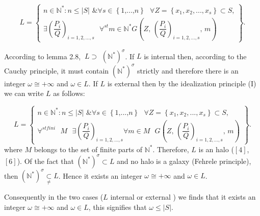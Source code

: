 \documentclass[12pt]{article}
\begin{document}
\begin{equation*}
L=\left\{ 
\begin{array}{c}
n\in \mathbb{N}^{\ast }:n\leq \left\vert S\right\vert \text{ \&}\forall s\in
\left\{ 1\text{,}...\text{,}n\right\} \text{ }\forall Z=\left\{
x_{1},x_{2},...,x_{s}\right\} \subset S\text{,} \\ 
\exists \left( \dfrac{P_{i}}{Q}\right) _{i=1,2,...,s}\text{ }\forall
^{st}m\in \mathbb{N}^{\ast }G\left( Z\text{, }\left( \dfrac{P_{i}}{Q}\right)
_{i=1,2,...,s}\text{, }m\right)%
\end{array}%
\right\} \text{.}
\end{equation*}

According to lemma 2.8, $\ L\supset $ $\left( \mathbb{N}^{\ast }\right)
^{\sigma }$. If $L$ is internal then, according to the Cauchy principle, it
must contain $\left( \mathbb{N}^{\ast }\right) ^{\sigma }$ strictly and
therefore there is an integer $\omega \cong +\infty $ and $\omega \in L$. If 
$L$ is external then by the idealization principle (I) we can write $L$ as
follows:\newline

\begin{equation*}
L=\left\{ 
\begin{array}{c}
n\in \mathbb{N}^{\ast }:n\leq \left\vert S\right\vert \text{ \&}\forall s\in
\left\{ 1\text{,}...\text{,}n\right\} \text{ }\forall Z=\left\{
x_{1},x_{2},...,x_{s}\right\} \subset S\text{,} \\ 
\forall ^{stfini}\text{ }M\text{ }\exists \left( \dfrac{P_{i}}{Q}\right)
_{i=1,2,...,s}\forall m\in M\text{ }G\left( Z\text{, }\left( \dfrac{P_{i}}{Q}%
\right) _{i=1,2,...,s}\text{, }m\right)%
\end{array}%
\right\} \text{.}
\end{equation*}%
where $M$ belongs to the set of finite parts of $\mathbb{N}^{\ast }$.
Therefore, $L$ is an halo ($\left[ 4\right] $, $\left[ 6\right] $). Of the
fact that $\left( \mathbb{N}^{\ast }\right) ^{\sigma }\subset L$ and no halo
is a galaxy (Fehrele principle), then $\left( \mathbb{N}^{\ast }\right)
^{\sigma }\underset{\neq }{\subset }L$. Hence it exists an integer $\omega
\cong +\infty $ and $\omega \in L$.

Consequently in the two cases ($L$ internal or external ) we finds that it
exists an integer $\omega \cong +\infty $ and $\omega \in L$, this signifies
that $\omega \leq \left\vert S\right\vert $.
\end{document}
